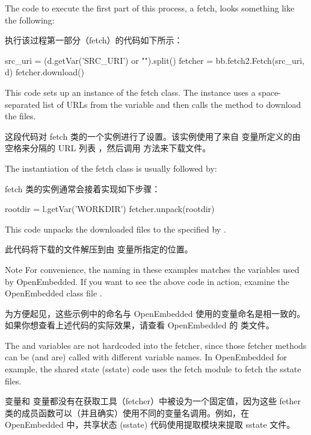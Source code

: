 
The code to execute the first part of this process, a fetch, looks something like the following:

执行该过程第一部分（fetch）的代码如下所示：

\begin{pyglist}
src_uri = (d.getVar('SRC_URI') or "").split()
fetcher = bb.fetch2.Fetch(src_uri, d)
fetcher.download()
\end{pyglist}

This code sets up an instance of the fetch class. The instance uses a space-separated list of URLs from the  variable and then calls the  method to download the files.

这段代码对 fetch 类的一个实例进行了设置。该实例使用了来自  变量所定义的由空格来分隔的 URL 列表 ，然后调用  方法来下载文件。

The instantiation of the fetch class is usually followed by:

fetch 类的实例通常会接着实现如下步骤：

\begin{pyglist}
rootdir = l.getVar('WORKDIR')
fetcher.unpack(rootdir)
\end{pyglist}

This code unpacks the downloaded files to the specified by .

此代码将下载的文件解压到由  变量所指定的位置。

\medskip
\begin{noteblock}{Note}%
For convenience, the naming in these examples matches the variables used by OpenEmbedded. If you want to see the above code in action, examine the OpenEmbedded class file .

\medskip
为方便起见，这些示例中的命名与 OpenEmbedded 使用的变量命名是相一致的。如果你想查看上述代码的实际效果，请查看 OpenEmbedded 的  类文件。
\end{noteblock}

The  and  variables are not hardcoded into the fetcher, since those fetcher methods can be (and are) called with different variable names. In OpenEmbedded for example, the shared state (sstate) code uses the fetch module to fetch the sstate files.

 变量和  变量都没有在获取工具（fetcher）中被设为一个固定值，因为这些 fether 类的成员函数可以（并且确实）使用不同的变量名调用。例如，在 OpenEmbedded 中，共享状态 (sstate) 代码使用提取模块来提取 sstate 文件。

